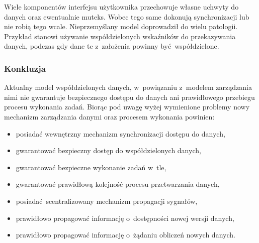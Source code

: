Wiele komponentów interfejsu użytkownika przechowuje własne uchwyty do danych oraz ewentualnie muteks. Wobec tego same dokonują synchronizacji lub nie robią tego wcale. Nieprzemyślany model doprowadził do wielu patologii. Przykład stanowi używanie współdzielonych wskaźników do przekazywania danych, podczas gdy dane te z~założenia powinny być współdzielone.

\subsubsection{Konkluzja}

Aktualny model współdzielonych danych, w~powiązaniu z~modelem zarządzania nimi nie gwarantuje bezpiecznego dostępu do danych ani prawidłowego przebiegu procesu wykonania zadań. Biorąc pod uwagę wyżej wymienione problemy nowy mechanizm zarządzania danymi oraz procesem wykonania powinien: 
\begin{itemize}
	\item posiadać wewnętrzny mechanizm synchronizacji dostępu do danych,
	\item gwarantować bezpieczny dostęp do współdzielonych danych,
	\item gwarantować bezpieczne wykonanie zadań w~tle,
	\item gwarantować prawidłową kolejność procesu przetwarzania danych,
	\item posiadać scentralizowany mechanizm propagacji sygnałów,
	\item prawidłowo propagować informację o~dostępności nowej wersji danych,
	\item prawidłowo propagować informację o~żądaniu obliczeń nowych danych.
\end{itemize}





